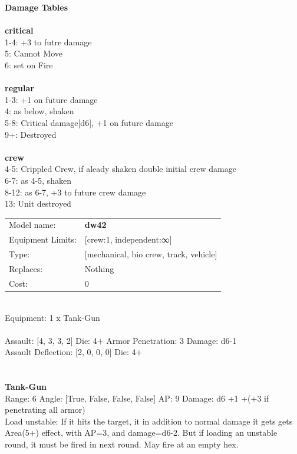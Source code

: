 {\bf Damage Tables} \\
\ \\ {\bf critical } \\
1-4: +3 to futre damage \\
5: Cannot Move \\
6: set on Fire \\
\ \\ {\bf regular } \\
1-3: +1 on future damage \\
4: as below, shaken \\
5-8: Critical damage[d6], +1 on future damage \\
9+: Destroyed \\
\ \\ {\bf crew } \\
4-5: Crippled Crew, if aleady shaken double initial crew damage \\
6-7: as 4-5, shaken \\
8-12: as 6-7, +3 to future crew damage \\
13: Unit destroyed \\


\noindent
\begin{tabular}{ll}
Model name: &{\bf dw42 } \\
Equipment Limits: &[crew:1, independent:∞] \\
Type: &[mechanical, bio crew, track, vehicle] \\
Replaces: &Nothing \\
Cost: & 0\\
\end{tabular}
\ \\
Equipment: 1 x Tank-Gun \\
\ \\
Assault: [4, 3, 3, 2] Die: 4+ Armor Penetration: 3 Damage: d6-1 \\
Assault Deflection: [2, 0, 0, 0] Die: 4+\\
\indent  
\ \\

\ \\
{\bf Tank-Gun } \\



Range: 6  Angle: [True, False, False, False] AP: 9 Damage: d6 +1 +(+3 if penetrating all armor) \\
Load unstable: If it hits the target, it in addition to normal damage it gets gets Area(5+) effect, with AP=3, and damage=d6-2. But if loading an unstable round, it must be fired in next round. May fire at an empty hex.\\ 




